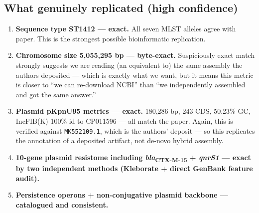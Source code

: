 \documentclass[11pt]{article}
\begin{document}
\subsection{What genuinely replicated (high confidence)}
\begin{enumerate}
  \item \textbf{Sequence type ST1412 --- exact.} All seven MLST alleles agree with paper. This is the strongest possible bioinformatic replication.
  \item \textbf{Chromosome size 5{,}055{,}295 bp --- byte-exact.} Suspiciously exact match strongly suggests we are reading (an equivalent to) the same assembly the authors deposited --- which is exactly what we want, but it means this metric is closer to ``we can re-download NCBI'' than ``we independently assembled and got the same answer.''
  \item \textbf{Plasmid pKpnU95 metrics --- exact.} 180{,}286 bp, 243 CDS, 50.23\% GC, IncFIB(K) 100\% id to CP011596 --- all match the paper. Again, this is verified against \texttt{MK552109.1}, which is the authors' deposit --- so this replicates the annotation of a deposited artifact, not de-novo hybrid assembly.
  \item \textbf{10-gene plasmid resistome including \textit{bla}\textsubscript{CTX-M-15} + \textit{qnrS1} --- exact by two independent methods (Kleborate + direct GenBank feature audit).}
  \item \textbf{Persistence operons + non-conjugative plasmid backbone --- catalogued and consistent.}
\end{enumerate}
\end{document}
